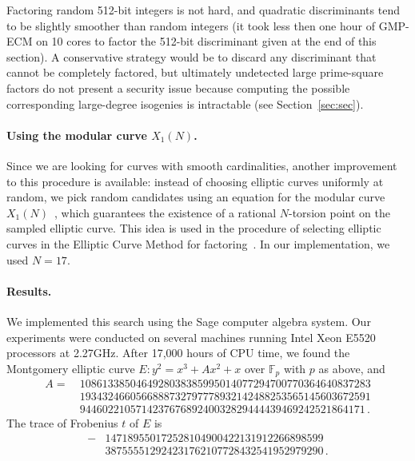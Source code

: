 \documentclass{llncs}
\newcommand{\F}{\mathbb{F}}
\begin{document}
\begin{remark}
    Factoring random 512-bit integers is not hard, and quadratic discriminants
    tend to be slightly smoother than random integers
    (it took less then one hour of GMP-ECM on 10 cores 
    to factor the 512-bit discriminant given at the end of this section).
    A conservative strategy would be to discard any discriminant 
    that cannot be completely factored,
    but ultimately undetected large prime-square factors
    do not present a security issue
    because computing the possible corresponding large-degree isogenies 
    is intractable (see Section~\ref{sec:sec}).
\end{remark}

\paragraph{Using the modular curve $X_1(N)$.}
Since we are looking for curves with smooth cardinalities, another
improvement to this procedure is available: instead of choosing elliptic
curves uniformly at random, we pick random candidates using
an equation for the modular curve $X_1(N)$~\cite{sutherland2012constructing},
which guarantees the existence of a rational $N$-torsion point
on the sampled elliptic curve.
This idea is used
in the procedure of selecting elliptic curves in the Elliptic Curve Method
for factoring~\cite{ECM20,GMP-ECM}.
In our implementation, we used $N = 17$. 

\paragraph{Results.}
We implemented this search using the Sage computer algebra system.
Our experiments were conducted on several machines running
Intel Xeon E5520 processors at 2.27GHz. %
After 17,000 hours of CPU time, we found the Montgomery elliptic curve 
$
	E : y^2 = x^3 + A x^2 + x
$
over $\F_p$ with $p$ as above, and
\[
\begin{aligned}
A =\ 
& 1086133850464928038385995014077294700770364640837283 \\
& 1934324660566888732797778932142488253565145603672591 \\
& 944602210571423767689240032829444439469242521864171\,.
\end{aligned}
\]
The trace of Frobenius $t$ of $E$ is
\[
\begin{aligned}
-&147189550172528104900422131912266898599 \\
&387555512924231762107728432541952979290\,.
\end{aligned}
\]
\end{document}

